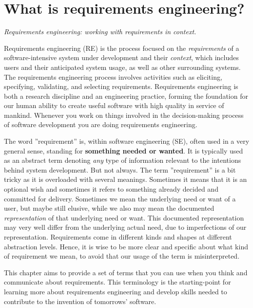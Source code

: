
\chapter*{What is requirements engineering?}

\textit{Requirements engineering: working with requirements in context.}

\vspace{1em}

\noindent Requirements engineering (RE) is the process focused on the \textit{requirements} of a software-intensive system under development and their \textit{context}, which includes users and their anticipated system usage, as well as other surrounding systems. 
The requirements engineering process involves activities such as eliciting, specifying, validating, and selecting requirements. 
Requirements engineering is both a research discipline and an engineering practice, forming the foundation for our human ability to create useful software with high quality in service of mankind. Whenever you work on things involved in the decision-making process of software development you are doing requirements engineering.  

The word ''requirement'' is, within software engineering (SE), often used in a very general sense, standing for \textbf{something needed or wanted}. It is typically used as an abstract term denoting \textit{any} type of information relevant to the intentions behind system development. But not always. The term ''requirement'' is a bit tricky as it is overloaded with several meanings. Sometimes it means that it is an optional wish and sometimes it refers to something already decided and committed for delivery. Sometimes we mean the underlying need or want of a user, but maybe still elusive, while we also may mean the documented \textit{representation} of that underlying need or want. This documented representation may very well differ from the underlying actual need, due to imperfections of our representation. Requirements come in different kinds and shapes at different abstraction levels. Hence, it is wise to be more clear and specific about what kind of requirement we mean, to avoid that our usage of the term is misinterpreted. 

This chapter aims to provide a set of terms that you can use when you think and communicate about requirements. This terminology is the starting-point for learning more about requirements engineering and develop skills needed to contribute to the invention of tomorrows' software.

